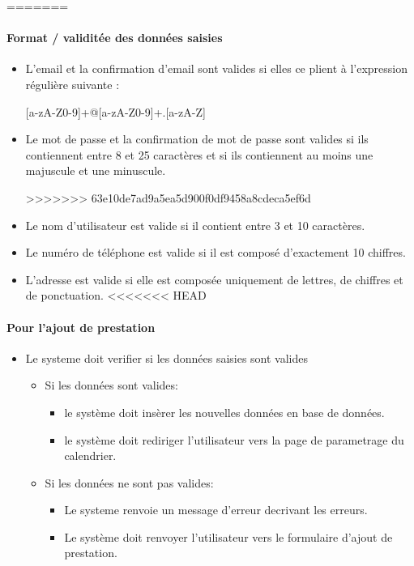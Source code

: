\documentclass{article}
\begin{document}
\begin{itemize}
\begin{itemize}
\begin{itemize}
=======

\paragraph{Format / validitée des données saisies}
\begin{itemize}
\item L'email  et la confirmation d'email sont valides si elles ce plient à l'expression régulière
  suivante :

[a-zA-Z0-9]+@[a-zA-Z0-9]+.[a-zA-Z]

\item Le mot de passe et la confirmation de mot de passe sont valides si ils contiennent entre 8 et 25
  caractères et si ils contiennent au moins une majuscule et une minuscule.

>>>>>>> 63e10de7ad9a5ea5d900f0df9458a8cdeca5ef6d
\item Le nom d'utilisateur est valide si il contient entre 3 et 10
  caractères.

\item Le numéro de téléphone est valide si il est composé d'exactement
  10 chiffres.

\item L'adresse est valide si elle est composée uniquement de lettres,
  de chiffres et de ponctuation.
<<<<<<< HEAD
\end{itemize}


\paragraph{Pour l'ajout de prestation}
\begin{itemize}
\item Le systeme doit verifier si les données saisies sont valides
	\begin{itemize}
	\item Si les données sont valides:
		\begin{itemize}
		\item le système doit insèrer les nouvelles données en base
                  de données.
                  \item le système doit rediriger l'utilisateur vers
                    la page de parametrage du calendrier.
		\end{itemize}
		\item Si les données ne sont pas valides:
		\begin{itemize}
		\item Le systeme renvoie un message d'erreur decrivant
                  les erreurs.
                \item Le système doit renvoyer l'utilisateur vers le
                  formulaire d'ajout de prestation.
		\end{itemize}
	\end{itemize}
\end{itemize}



\end{itemize}
\end{itemize}
\end{itemize}
\end{document}
